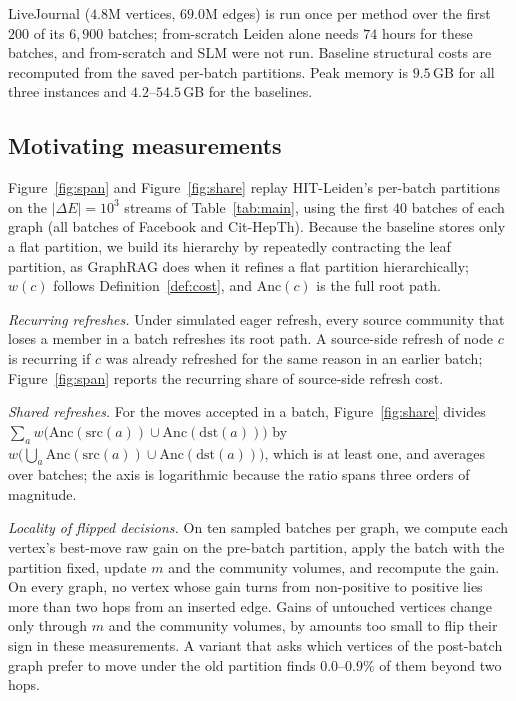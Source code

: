 LiveJournal ($4.8$M vertices, $69.0$M edges) is run once per method over the
first $200$ of its $6{,}900$ batches; from-scratch Leiden alone needs $74$ hours
for these batches, and from-scratch \Louvain{} and SLM were not run. Baseline
structural costs are recomputed from the saved per-batch partitions. Peak
memory is $9.5$\,GB for all three \DyLo{} instances and $4.2$--$54.5$\,GB for
the baselines.

\subsection{Motivating measurements}
\label{app:motivation}

Figure~\ref{fig:span} and Figure~\ref{fig:share} replay HIT-Leiden's per-batch
partitions on the $|\Delta E|=10^3$ streams of Table~\ref{tab:main}, using the
first $40$ batches of each graph (all batches of Facebook and Cit-HepTh). Because the baseline stores only a flat partition, we build its
hierarchy by repeatedly contracting the leaf partition, as GraphRAG does when
it refines a flat partition hierarchically; $w(c)$ follows
Definition~\ref{def:cost}, and $\mathrm{Anc}(c)$ is the full root path.

\emph{Recurring refreshes.} Under simulated eager refresh, every source
community that loses a member in a batch refreshes its root path. A
source-side refresh of node $c$ is recurring if $c$ was already refreshed for
the same reason in an earlier batch; Figure~\ref{fig:span} reports the
recurring share of source-side refresh cost.

\emph{Shared refreshes.} For the moves accepted in a batch,
Figure~\ref{fig:share} divides
$\sum_a w\bigl(\mathrm{Anc}(\mathrm{src}(a))\cup\mathrm{Anc}(\mathrm{dst}(a))\bigr)$
by $w\bigl(\bigcup_a\mathrm{Anc}(\mathrm{src}(a))\cup\mathrm{Anc}(\mathrm{dst}(a))\bigr)$,
which is at least one, and averages over batches; the axis is logarithmic
because the ratio spans three orders of magnitude.

\emph{Locality of flipped decisions.} On ten sampled batches per graph, we
compute each vertex's best-move raw gain on the pre-batch partition, apply the
batch with the partition fixed, update $m$ and the community volumes, and
recompute the gain. On every graph, no vertex whose gain turns from
non-positive to positive lies more than two hops from an inserted edge. Gains
of untouched vertices change only through $m$ and the community volumes, by
amounts too small to flip their sign in these measurements. A variant that asks
which vertices of the post-batch graph prefer to move under the old partition
finds $0.0$--$0.9\%$ of them beyond two hops.

